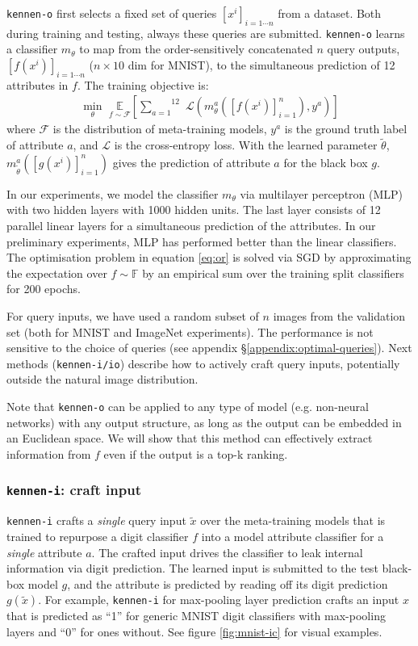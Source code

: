 \documentclass{article} %
\newcommand{\OR}{\texttt{kennen-o}\xspace}
\newcommand{\IC}{\texttt{kennen-i}\xspace}
\begin{document}
\OR first selects a fixed set of queries $[x^i]_{i=1\cdots n}$ from a dataset. Both during training and testing, always these queries are submitted. \OR learns a classifier $m_\theta$ to map from the order-sensitively concatenated $n$ query outputs, $[f(x^i)]_{i=1\cdots n}$ ($n\times 10$ dim for MNIST), to the simultaneous prediction of 12 attributes in $f$. The training objective is:
\begin{align}
\label{eq:or}
\underset{\theta}{\min}\,\,\underset{f\sim \mathcal{F}}{\mathbb{E}}\left[\overset{12}{\underset{a=1}{\sum}}\,\,\mathcal{L}\left(m^a_{\theta}\left([f(x^i)]_{i=1}^n\right), y^a\right)\right]
\end{align}
where $\mathcal{F}$ is the distribution of meta-training models, $y^a$ is the ground truth label of attribute $a$, and $\mathcal{L}$ is the cross-entropy loss. With the learned parameter $\tilde{\theta}$, $m^a_{\tilde{\theta}}\left([g(x^i)]_{i=1}^n\right)$ gives the prediction of attribute $a$ for the black box $g$.

In our experiments, we model the classifier $m_\theta$ via multilayer perceptron (MLP) with two hidden layers with 1000 hidden units. The last layer consists of 12 parallel linear layers for a simultaneous prediction of the attributes. In our preliminary experiments, MLP has performed better than the linear classifiers. The optimisation problem in equation \ref{eq:or} is solved via SGD by approximating the expectation over $f\sim\mathbb{F}$ by an empirical sum over the training split classifiers for 200 epochs. 

For query inputs, we have used a random subset of $n$ images from the validation set (both for MNIST and ImageNet experiments). The performance is not sensitive to the choice of queries (see appendix \S\ref{appendix:optimal-queries}). Next methods (\texttt{kennen-i/io}) describe how to actively craft query inputs, potentially outside the natural image distribution.

Note that \OR can be applied to any type of model (e.g. non-neural networks) with any output structure, as long as the output can be embedded in an Euclidean space. We will show that this method can effectively extract information from $f$ even if the output is a top-k ranking.

\subsubsection*{\IC: craft input}

\IC crafts a \emph{single} query input $\tilde{x}$ over the meta-training models that is trained to repurpose a digit classifier $f$ into a model attribute classifier for a \emph{single} attribute $a$. The crafted input drives the classifier to leak internal information via digit prediction. The learned input is submitted to the test black-box model $g$, and the attribute is predicted by reading off its digit prediction $g(\tilde{x})$. For example, \IC for max-pooling layer prediction crafts an input $x$ that is predicted as ``1'' for generic MNIST digit classifiers with max-pooling layers and ``0'' for ones without.  See figure \ref{fig:mnist-ic} for visual examples. 
\end{document}
